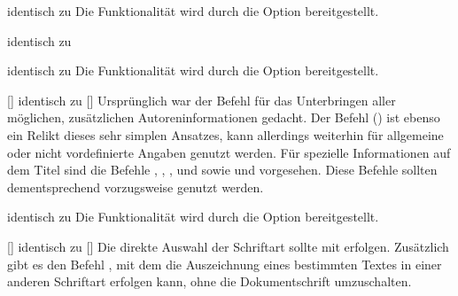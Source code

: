 \begin{DeclareEntity}{}
\begin{Declaration}
  {}
  {identisch zu }
\printdeclarationlist
%
Die Funktionalität wird durch die Option  bereitgestellt.
\end{Declaration}

\begin{Declaration}
  {}
  {identisch zu }
\begin{Declaration}
  {}
  {identisch zu }
\printdeclarationlist
%
Die Funktionalität wird durch die Option  bereitgestellt.
\end{Declaration}
\end{Declaration}

\begin{Declaration}
  {[]}
  {identisch zu []}
\printdeclarationlist
%
Ursprünglich war der Befehl für das Unterbringen aller möglichen, zusätzlichen 
Autoreninformationen gedacht. Der Befehl () 
ist ebenso ein Relikt dieses sehr simplen Ansatzes, kann allerdings weiterhin 
für allgemeine oder nicht vordefinierte Angaben genutzt werden. Für spezielle 
Informationen auf dem Titel sind die Befehle , 
, ,  
und  sowie  und 
 vorgesehen. Diese Befehle sollten dementsprechend 
vorzugsweise genutzt werden.
\end{Declaration}

\begin{Declaration}
  {}
  {identisch zu }
\printdeclarationlist
%
Die Funktionalität wird durch die Option  bereitgestellt.
\end{Declaration}

\begin{Declaration}
  {[]}
  {identisch zu []}
\printdeclarationlist
%
Die direkte Auswahl der Schriftart sollte mit  erfolgen. 
Zusätzlich gibt es den Befehl , mit dem die Auszeichnung 
eines bestimmten Textes in einer anderen Schriftart erfolgen kann, ohne die 
Dokumentschrift umzuschalten.
\end{Declaration}
%




\end{DeclareEntity}
